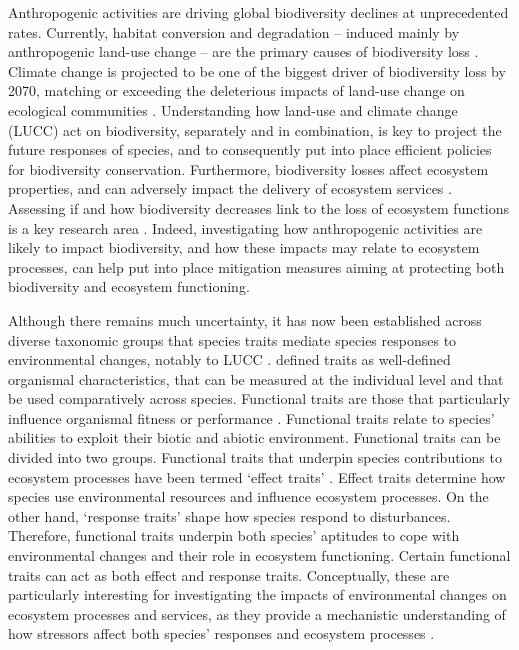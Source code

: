 Anthropogenic activities are driving global biodiversity declines at unprecedented rates. Currently, habitat conversion and degradation -- induced mainly by anthropogenic land-use change -- are the primary causes of biodiversity loss \citep{Pereira2012, Newbold2015}. Climate change is projected to be one of the biggest driver of biodiversity loss by 2070, matching or exceeding the deleterious impacts of land-use change on ecological communities \citep{Newbold2018}. Understanding how land-use and climate change (LUCC) act on biodiversity, separately and in combination, is key to project the future responses of species, and to consequently put into place efficient policies for biodiversity conservation. Furthermore, biodiversity losses affect ecosystem properties, and can adversely impact the delivery of ecosystem services \citep{Hooper2012, Oliver2015,MEA2005}. Assessing if and how biodiversity decreases link to the loss of ecosystem functions is a key research area \citep{Petchey2006, Lefcheck2015}. Indeed, investigating how anthropogenic activities are likely to impact biodiversity, and how these impacts may relate to ecosystem processes, can help put into place mitigation measures aiming at protecting both biodiversity and ecosystem functioning.

Although there remains much uncertainty, it has now been established across diverse taxonomic groups that species traits mediate species responses to environmental changes, notably to LUCC \citep{Newbold2013, Pearson2014,Pacifici2017,Estrada2018, Angert2011}.
\citet{McGill2006} defined traits as well-defined organismal characteristics, that can be measured at the individual level and that be used comparatively across species. Functional traits are those that particularly influence organismal fitness or performance \citep{Violle2007}. Functional traits relate to species' abilities to exploit their biotic and abiotic environment. Functional traits can be divided into two groups. Functional traits that underpin species contributions to ecosystem processes have been termed `effect traits' \citep{Lavorel2002, Wong2018}.  Effect traits determine how species use environmental resources and influence ecosystem processes. On the other hand, `response traits' shape how species respond to disturbances. Therefore, functional traits underpin both species' aptitudes to cope with environmental changes and their role in ecosystem functioning.  Certain functional traits can act as both effect and response traits. Conceptually, these are particularly interesting for investigating the impacts of environmental changes on ecosystem processes and services, as they provide a mechanistic understanding of how stressors affect both species' responses and ecosystem processes \citep{Lavorel2002, Luck2012, Hevia2017}.
  
